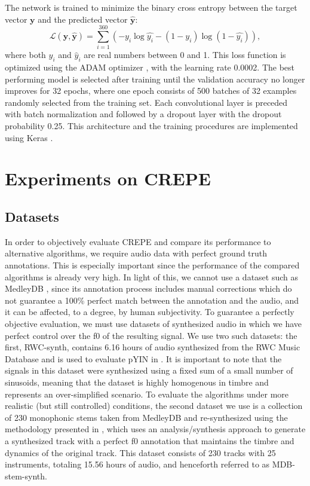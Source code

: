 The network is trained to minimize the binary cross entropy between the target vector $\mathbf{y}$ and the predicted vector $\mathbf{\hat{y}}$:
\begin{equation}
\mathcal{L}(\mathbf{y}, \mathbf{\hat{y}}) = \sum_{i=1}^{360} \left ( - y_i \log \hat{y_i} - (1 - y_i) \log (1 - \hat{y_i}) \right ),
\end{equation}
where both $y_i$ and $\hat{y}_i$ are real numbers between 0 and 1.
This loss function is optimized using the ADAM optimizer \cite{kingma2015adam}, with the learning rate 0.0002. 
The best performing model is selected after training until the validation accuracy no longer improves for 32 epochs, where one epoch consists of 500 batches of 32 examples randomly selected from the training set. 
Each convolutional layer is preceded with batch normalization \cite{ioffe2015batchnorm} and followed by a dropout layer \cite{srivastava2014dropout} with the dropout probability 0.25.
This architecture and the training procedures are implemented using Keras \cite{chollet2015keras}.




\section{Experiments on CREPE}

\subsection{Datasets}

In order to objectively evaluate CREPE and compare its performance to alternative algorithms, we require audio data with perfect ground truth annotations.
This is especially important since the performance of the compared algorithms is already very high.
In light of this, we cannot use a dataset such as MedleyDB \cite{bittner2014medleydb}, since its annotation process includes manual corrections which do not guarantee a 100\% perfect match between the annotation and the audio, and it can be affected, to a degree, by human subjectivity.
To guarantee a perfectly objective evaluation, we must use datasets of synthesized audio in which we have perfect control over the f0 of the resulting signal.
We use two such datasets: the first, RWC-synth, contains 6.16 hours of audio synthesized from the RWC Music Database \cite{goto2002rwc} and is used to evaluate pYIN in \cite{mauch2014pyin}.
It is important to note that the signals in this dataset were synthesized using a fixed sum of a small number of sinusoids, meaning that the dataset is highly homogenous in timbre and represents an over-simplified scenario.
To evaluate the algorithms under more realistic (but still controlled) conditions, the second dataset we use is a collection of 230 monophonic stems taken from MedleyDB and re-synthesized using the methodology presented in \cite{salamon2017analysis}, which uses an analysis/synthesis approach to generate a synthesized track with a perfect f0 annotation that maintains the timbre and dynamics of the original track.
This dataset consists of 230 tracks with 25 instruments, totaling 15.56 hours of audio, and henceforth referred to as MDB-stem-synth.


